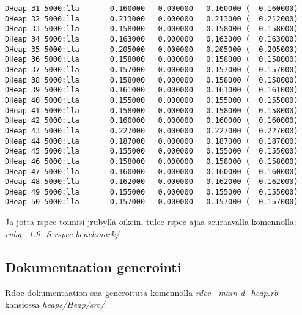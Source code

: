 \documentclass[a4paper,12pt]{article}
\begin{document}
\begin{verbatim}
DHeap 31 5000:lla       0.160000   0.000000   0.160000 (  0.160000)
DHeap 32 5000:lla       0.213000   0.000000   0.213000 (  0.212000)
DHeap 33 5000:lla       0.158000   0.000000   0.158000 (  0.158000)
DHeap 34 5000:lla       0.163000   0.000000   0.163000 (  0.163000)
DHeap 35 5000:lla       0.205000   0.000000   0.205000 (  0.205000)
DHeap 36 5000:lla       0.158000   0.000000   0.158000 (  0.158000)
DHeap 37 5000:lla       0.157000   0.000000   0.157000 (  0.157000)
DHeap 38 5000:lla       0.158000   0.000000   0.158000 (  0.158000)
DHeap 39 5000:lla       0.161000   0.000000   0.161000 (  0.161000)
DHeap 40 5000:lla       0.155000   0.000000   0.155000 (  0.155000)
DHeap 41 5000:lla       0.158000   0.000000   0.158000 (  0.158000)
DHeap 42 5000:lla       0.160000   0.000000   0.160000 (  0.160000)
DHeap 43 5000:lla       0.227000   0.000000   0.227000 (  0.227000)
DHeap 44 5000:lla       0.187000   0.000000   0.187000 (  0.187000)
DHeap 45 5000:lla       0.155000   0.000000   0.155000 (  0.155000)
DHeap 46 5000:lla       0.158000   0.000000   0.158000 (  0.158000)
DHeap 47 5000:lla       0.160000   0.000000   0.160000 (  0.160000)
DHeap 48 5000:lla       0.162000   0.000000   0.162000 (  0.162000)
DHeap 49 5000:lla       0.155000   0.000000   0.155000 (  0.155000)
DHeap 50 5000:lla       0.157000   0.000000   0.157000 (  0.157000)
\end{verbatim}
\normalsize
Ja jotta rspec toimisi jrubyllä oikein, tulee rspec ajaa seuraavalla komennolla: \emph{ruby --1.9 -S rspec benchmark/}

\subsection{Dokumentaation generointi}
Rdoc dokumentaation saa generoituta komennolla \emph{rdoc --main d\_heap.rb} kansiossa  \emph{heaps/Heap/src/}.
\end{document}
